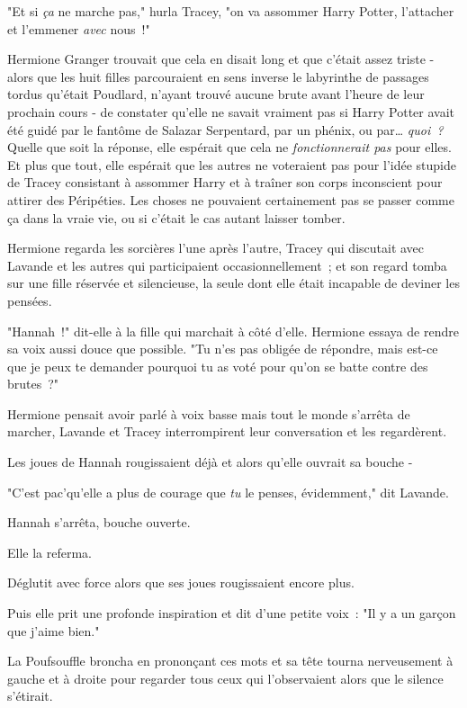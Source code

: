 "Et si \emph{ça} ne marche pas," hurla Tracey, "on va assommer Harry Potter, l'attacher et l'emmener \emph{avec} nous~!"

\later

Hermione Granger trouvait que cela en disait long et que c'était assez triste - alors que les huit filles parcouraient en sens inverse le labyrinthe de passages tordus qu'était Poudlard, n'ayant trouvé aucune brute avant l'heure de leur prochain cours - de constater qu'elle ne savait vraiment pas si Harry Potter avait été guidé par le fantôme de Salazar Serpentard, par un phénix, ou par… \emph{quoi~?} Quelle que soit la réponse, elle espérait que cela ne \emph{fonctionnerait pas} pour elles. Et plus que tout, elle espérait que les autres ne voteraient pas pour l'idée stupide de Tracey consistant à assommer Harry et à traîner son corps inconscient pour attirer des Péripéties. Les choses ne pouvaient certainement pas se passer comme ça dans la vraie vie, ou si c'était le cas autant laisser tomber.

Hermione regarda les sorcières l'une après l'autre, Tracey qui discutait avec Lavande et les autres qui participaient occasionnellement~; et son regard tomba sur une fille réservée et silencieuse, la seule dont elle était incapable de deviner les pensées.

"Hannah~!" dit-elle à la fille qui marchait à côté d'elle. Hermione essaya de rendre sa voix aussi douce que possible. "Tu n'es pas obligée de répondre, mais est-ce que je peux te demander pourquoi tu as voté pour qu'on se batte contre des brutes~?"

Hermione pensait avoir parlé à voix basse mais tout le monde s'arrêta de marcher, Lavande et Tracey interrompirent leur conversation et les regardèrent.

Les joues de Hannah rougissaient déjà et alors qu'elle ouvrait sa bouche -

"C'est pac'qu'elle a plus de courage que \emph{tu} le penses, évidemment," dit Lavande.

Hannah s'arrêta, bouche ouverte.

Elle la referma.

Déglutit avec force alors que ses joues rougissaient encore plus.

Puis elle prit une profonde inspiration et dit d'une petite voix~: "Il y a un garçon que j'aime bien."

La Poufsouffle broncha en prononçant ces mots et sa tête tourna nerveusement à gauche et à droite pour regarder tous ceux qui l'observaient alors que le silence s'étirait.

